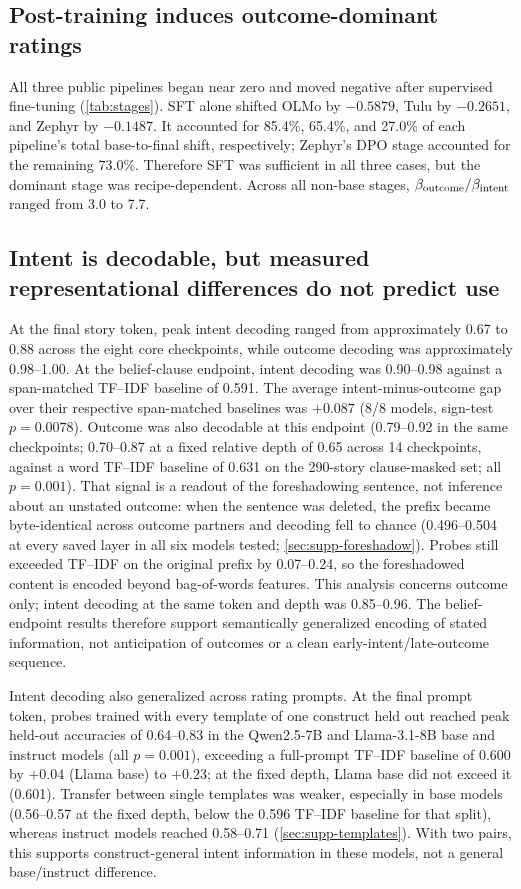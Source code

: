 \subsection{Post-training induces outcome-dominant ratings}

All three public pipelines began near zero and moved negative after supervised fine-tuning (\cref{tab:stages}).
SFT alone shifted OLMo by $-0.5879$, Tulu by $-0.2651$, and Zephyr by $-0.1487$.
It accounted for 85.4\%, 65.4\%, and 27.0\% of each pipeline's total base-to-final shift, respectively; Zephyr's DPO stage accounted for the remaining 73.0\%.
Therefore SFT was sufficient in all three cases, but the dominant stage was recipe-dependent.
Across all non-base stages, $\beta_{\mathrm{outcome}}/\beta_{\mathrm{intent}}$ ranged from 3.0 to 7.7.

\subsection{Intent is decodable, but measured representational differences do not predict use}

At the final story token, peak intent decoding ranged from approximately 0.67 to 0.88 across the eight core checkpoints, while outcome decoding was approximately 0.98--1.00.
At the belief-clause endpoint, intent decoding was 0.90--0.98 against a span-matched TF--IDF baseline of 0.591.
The average intent-minus-outcome gap over their respective span-matched baselines was $+0.087$ (8/8 models, sign-test $p=0.0078$).
Outcome was also decodable at this endpoint (0.79--0.92 in the same checkpoints; 0.70--0.87 at a fixed relative depth of 0.65 across 14 checkpoints, against a word TF--IDF baseline of 0.631 on the 290-story clause-masked set; all $p=0.001$).
That signal is a readout of the foreshadowing sentence, not inference about an unstated outcome: when the sentence was deleted, the prefix became byte-identical across outcome partners and decoding fell to chance (0.496--0.504 at every saved layer in all six models tested; \cref{sec:supp-foreshadow}).
Probes still exceeded TF--IDF on the original prefix by 0.07--0.24, so the foreshadowed content is encoded beyond bag-of-words features.
This analysis concerns outcome only; intent decoding at the same token and depth was 0.85--0.96.
The belief-endpoint results therefore support semantically generalized encoding of stated information, not anticipation of outcomes or a clean early-intent/late-outcome sequence.

Intent decoding also generalized across rating prompts.
At the final prompt token, probes trained with every template of one construct held out reached peak held-out accuracies of 0.64--0.83 in the Qwen2.5-7B and Llama-3.1-8B base and instruct models (all $p=0.001$), exceeding a full-prompt TF--IDF baseline of 0.600 by $+0.04$ (Llama base) to $+0.23$; at the fixed depth, Llama base did not exceed it (0.601).
Transfer between single templates was weaker, especially in base models (0.56--0.57 at the fixed depth, below the 0.596 TF--IDF baseline for that split), whereas instruct models reached 0.58--0.71 (\cref{sec:supp-templates}).
With two pairs, this supports construct-general intent information in these models, not a general base/instruct difference.


